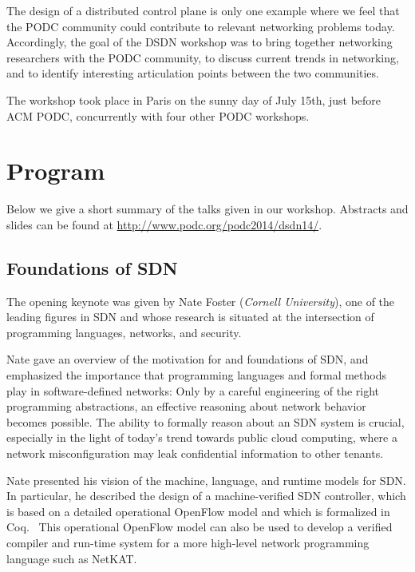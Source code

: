 \documentclass[11pt,pdftex,letter]{article}
\begin{document}
The design of a distributed control plane is only one example where we feel that the
PODC community could contribute to relevant networking problems today.
Accordingly, the goal of the DSDN workshop was to bring together networking researchers with the PODC
community, to discuss current trends in networking, and to identify interesting articulation
points between the two communities.

The workshop took
place in Paris on the sunny day of July 15th, just before
ACM PODC, concurrently with four other PODC workshops.

\section{Program}

Below we give a short summary of the talks given in our
workshop. Abstracts and slides can be found at \url{http://www.podc.org/podc2014/dsdn14/}.

\subsection{Foundations of SDN}

The opening keynote was given by Nate Foster (\emph{Cornell University}),
one of the leading figures in SDN and whose research
is situated at the intersection of programming languages, networks, and security.

Nate gave an overview of the motivation for and foundations of SDN, and
emphasized the importance that programming languages and formal methods
play in software-defined networks: Only by a careful engineering of the right programming abstractions,
an effective reasoning about network behavior becomes possible. The ability to
formally reason about an SDN system is crucial, especially in the light
of today's trend towards public cloud computing, where a network misconfiguration may
leak confidential information to other tenants.

Nate presented his vision of the machine, language, and runtime models for SDN.
In particular, he described the design of a machine-verified SDN controller,
which is based on a detailed operational OpenFlow model
and which is formalized in Coq.~\cite{machine-verified}
This operational OpenFlow model can also be used
to develop a verified compiler and run-time system
for a more high-level network programming language such as NetKAT.~\cite{netkat}
\end{document}
